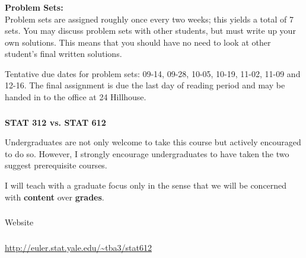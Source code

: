 \begin{frame}[fragile] \frametitle{}

{\bf Problem Sets:} \\
Problem sets are assigned roughly once every two weeks;
this yields a total of 7 sets.
You may discuss problem sets with other students, but must write up your
own solutions. This means that you should have no need to look at other
student's final written solutions.

\bigskip

Tentative due dates for problem sets: 09-14, 09-28, 10-05, 10-19, 11-02,
11-09 and 12-16. The final assignment is due the last day of reading period
and may be handed in to the office at 24 Hillhouse.

\end{frame}

\begin{frame}[fragile] \frametitle{}

{\bf STAT 312 vs. STAT 612} \pause

Undergraduates are not only welcome to take this course but
actively encouraged to do so. However, I strongly encourage
undergraduates to have taken the two suggest prerequisite
courses. \pause

I will teach with a graduate focus only in the sense that we
will be concerned with {\bf content} over {\bf grades}.

\end{frame}

\begin{frame}[fragile] \frametitle{}

\begin{flushright}
{\color{yaleblue}\sc\fontsize{1cm}{0cm}\selectfont Website}
\end{flushright}

\end{frame}


\begin{frame}[fragile] \frametitle{}

{\fontsize{0.5cm}{0cm}\selectfont
\url{http://euler.stat.yale.edu/~tba3/stat612}
}

\end{frame}

